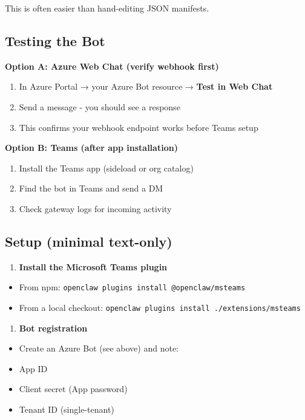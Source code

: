 This is often easier than hand-editing JSON manifests.

\subsection{Testing the Bot}


\textbf{Option A: Azure Web Chat (verify webhook first)}

\begin{enumerate}
  \item In Azure Portal → your Azure Bot resource → \textbf{Test in Web Chat}
  \item Send a message - you should see a response
  \item This confirms your webhook endpoint works before Teams setup
\end{enumerate}


\textbf{Option B: Teams (after app installation)}

\begin{enumerate}
  \item Install the Teams app (sideload or org catalog)
  \item Find the bot in Teams and send a DM
  \item Check gateway logs for incoming activity
\end{enumerate}


\subsection{Setup (minimal text-only)}


\begin{enumerate}
  \item \textbf{Install the Microsoft Teams plugin}
\end{enumerate}

\begin{itemize}
  \item From npm: \texttt{openclaw plugins install @openclaw/msteams}
  \item From a local checkout: \texttt{openclaw plugins install ./extensions/msteams}
\end{itemize}


\begin{enumerate}
  \item \textbf{Bot registration}
\end{enumerate}

\begin{itemize}
  \item Create an Azure Bot (see above) and note:
  \item App ID
  \item Client secret (App password)
  \item Tenant ID (single-tenant)
\end{itemize}


